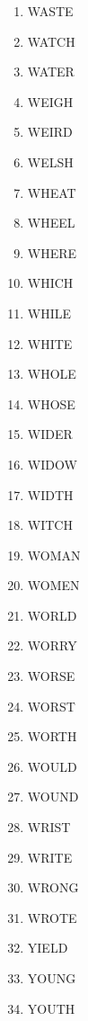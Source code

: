 \documentclass[pt]{article}
\begin{document}
{\begin{multicols}{9}
\begin{enumerate}[itemsep=1pt,parsep=0pt]
\item WASTE
\item WATCH
\item WATER
\item WEIGH
\item WEIRD
\item WELSH
\item WHEAT
\item WHEEL
\item WHERE
\item WHICH
\item WHILE
\item WHITE
\item WHOLE
\item WHOSE
\item WIDER
\item WIDOW
\item WIDTH
\item WITCH
\item WOMAN
\item WOMEN
\item WORLD
\item WORRY
\item WORSE
\item WORST
\item WORTH
\item WOULD
\item WOUND
\item WRIST
\item WRITE
\item WRONG
\item WROTE
\item YIELD
\item YOUNG
\item YOUTH
\end{enumerate}
\end{multicols} %
}
\end{document}
